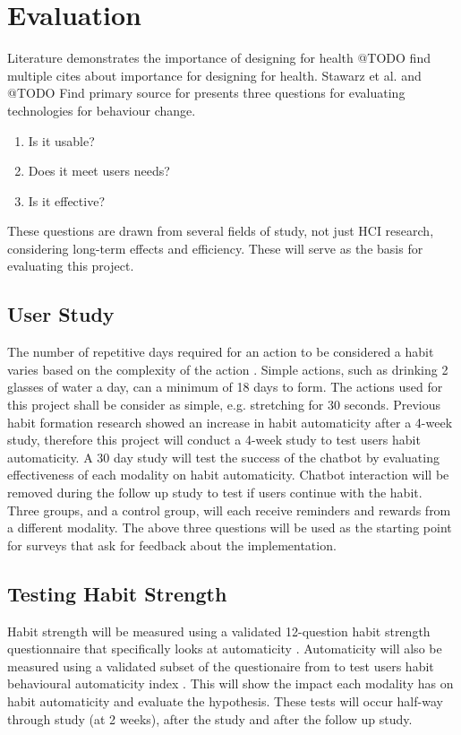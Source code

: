 
\newpage
\section{Evaluation}

Literature demonstrates the importance of designing for health @TODO find multiple cites about importance for designing for health. Stawarz et al. \cite{article_designing_for_health_behaviour_change_hci} and @TODO Find primary source for \cite{article_designing_for_health_behaviour_change_hci} presents three questions for evaluating technologies for behaviour change.
\begin{enumerate}
\item Is it usable?
\item Does it meet users needs?
\item Is it effective?
\end{enumerate}
These questions are drawn from several fields of study, not just HCI research, considering long-term effects and efficiency. These will serve as the basis for evaluating this project.

\subsection{User Study}
The number of repetitive days required for an action to be considered a habit varies based on the complexity of the action \cite{article_how_habits_formed_modelling_habit_formation}. Simple actions, such as drinking 2 glasses of water a day, can a minimum of 18 days to form. The actions used for this project shall be consider as simple, e.g. stretching for 30 seconds. Previous habit formation research \cite{article_beyond_self_tracking_designing_apps} showed an increase in habit automaticity after a 4-week study, therefore this project will conduct a 4-week study to test users habit automaticity.\newline
\newline
A 30 day study will test the success of the chatbot by evaluating effectiveness of each modality on habit automaticity. Chatbot interaction will be removed during the follow up study to test if users continue with the habit. Three groups, and a control group, will each receive reminders and rewards from a different modality. The above three questions will be used as the starting point for surveys that ask for feedback about the implementation.

\subsection{Testing Habit Strength}
Habit strength will be measured using a validated 12-question habit strength questionnaire that specifically looks at automaticity \cite{article_habit_strength}. Automaticity will also be measured using a validated subset of the questionaire from \cite{article_habit_strength} to test users habit behavioural automaticity index \cite{article_habit_measurement}. This will show the impact each modality has on habit automaticity and evaluate the hypothesis. These tests \cite{article_habit_strength, article_habit_measurement} will occur half-way through study (at 2 weeks), after the study and after the follow up study.